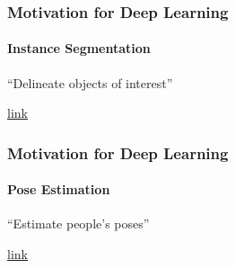 \documentclass[xetex,professionalfont]{beamer}
\begin{document}
\begin{frame}
\frametitle{Motivation for Deep Learning}
\framesubtitle{Instance Segmentation}

\begin{center}
\enquote{Delineate objects of interest} %
\end{center}

\smallskip

\begin{center}
    {\centering\href{https://www.youtube.com/watch?v=OOT3UIXZztE}{link}} %
\end{center}

\end{frame}


\begin{frame}
\frametitle{Motivation for Deep Learning}
\framesubtitle{Pose Estimation}

\begin{center}
    \enquote{Estimate people's poses} %
\end{center}

\smallskip


\begin{center}
    {\centering\href{https://www.youtube.com/watch?v=pW6nZXeWlGM}{link}}
\end{center}

\end{frame}
\end{document}
